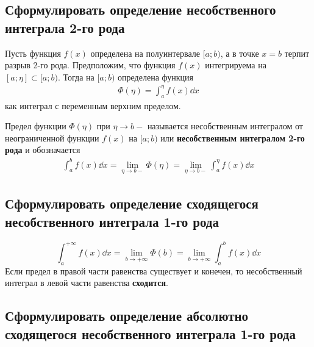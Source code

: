 \subsection{Сформулировать определение несобственного интеграла 2-го рода}
Пусть функция $f(x)$ определена на полуинтервале $[a;b)$, а в точке $x = b$ терпит разрыв 2-го рода. Предположим, что функция $f(x)$ интегрируема на $[a; \eta] \subset [a;b)$. Тогда на $[a; b)$ определена функция
\begin{gather}
    \Phi (\eta) = \int_{a}^{\eta} f(x)\dd{x}
\end{gather}
как интеграл с переменным верхним пределом. \\
\begin{definition}
    Предел функции $\Phi (\eta)$ при $\eta \to b-$ называется несобственным интегралом от неограниченной функции $f(x)$ на $[a;b)$ или \textbf{несобственным интегралом 2-го рода} и обозначается
    \begin{gather}
        \boxed{\int_{a}^{b} f(x)\dd{x} = \lim\limits_{\eta \to b-} \Phi (\eta) = \lim\limits_{\eta \to b-} \int_{a}^{\eta} f(x)\dd{x}}
    \end{gather}
\end{definition}

\subsection{Сформулировать определение сходящегося несобственного интеграла 1-го рода}

\begin{definition}
    \[
        \int_{a}^{+\infty} f(x)\dd{x} = \lim_{b \to +\infty} \Phi(b) = \lim\limits_{b \to +\infty} \int_{a}^{b}f(x)\dd{x}
    \]
    Если предел в правой части равенства существует и конечен, то несобственный интеграл в левой части равенства \textbf{сходится}.
\end{definition}

\subsection{Сформулировать определение абсолютно сходящегося несобственного интеграла 1-го рода}

